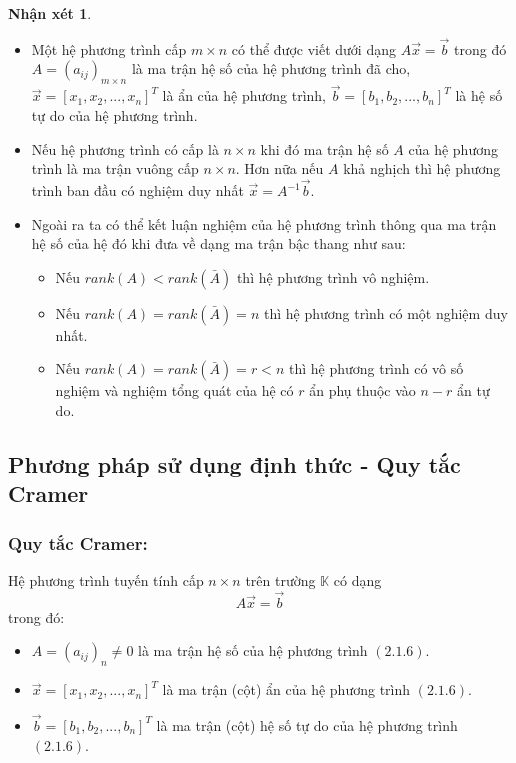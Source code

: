 \documentclass[12pt,a4paper,oneside]{book}
\theoremstyle{theorem}
\theoremstyle{definition}
\newtheorem{nx}[theorem2]{Nhận xét}
\begin{document}
\begin{nx}
\begin{itemize}
    \item  Một hệ phương trình cấp $m\times n$ có thể được viết dưới dạng 
    $A\vec{x}=\vec{b} $ trong đó $A=(a_{ij})_{m\times n} $ là ma trận hệ số của hệ phương trình đã cho, $\vec{x}=[x_1,x_2,...,x_n]^T$ là ẩn của hệ phương trình, $\vec{b}=[b_1,b_2,...,b_n]^T$ là hệ số tự do của hệ phương trình.
    \item Nếu hệ phương trình có cấp là $n\times n$ khi đó ma trận hệ số $A$ của hệ phương trình là ma trận vuông cấp $n\times n$. Hơn nữa nếu $A$ khả nghịch thì hệ phương trình ban đầu có nghiệm duy nhất $\vec{x}=A^{-1}\vec{b}$.

    \item Ngoài ra ta có thể kết luận nghiệm của hệ phương trình thông qua ma trận hệ số của hệ đó khi đưa về dạng ma trận bậc thang như sau:
    \begin{itemize}
        \item Nếu $rank(A)< rank(\bar{A})$ thì hệ phương trình vô nghiệm.
        \item Nếu $rank(A)= rank(\bar{A})=n$ thì hệ phương trình có một nghiệm duy nhất.
        \item Nếu $rank(A)= rank(\bar{A})=r<n$ thì hệ phương trình có vô số nghiệm và nghiệm tổng quát của hệ có $r$ ẩn phụ thuộc vào $n-r$ ẩn tự do.
    \end{itemize}
    
\end{itemize}
\end{nx}

\subsection{Phương pháp sử dụng định thức - Quy tắc Cramer}
\subsubsection{Quy tắc Cramer:}
     Hệ phương trình tuyến tính cấp $n\times n$ trên trường $\mathbb{K}$ có dạng 
    \begin{equation}
        A\vec{x}=\vec{b}
    \end{equation} trong đó:
\begin{itemize}
    \item $A=(a_{ij})_n\neq0$ là ma trận hệ số của hệ phương trình $(2.1.6)$.
    \item $\vec{x}=[x_1,x_2,...,x_n]^T$ là ma trận (cột) ẩn của hệ phương trình $(2.1.6)$.
    \item $\vec{b}=[b_1,b_2,...,b_n]^T$ là ma trận (cột) hệ số tự do của hệ phương trình $(2.1.6)$.
    
    \end{itemize}
    
\end{document}
